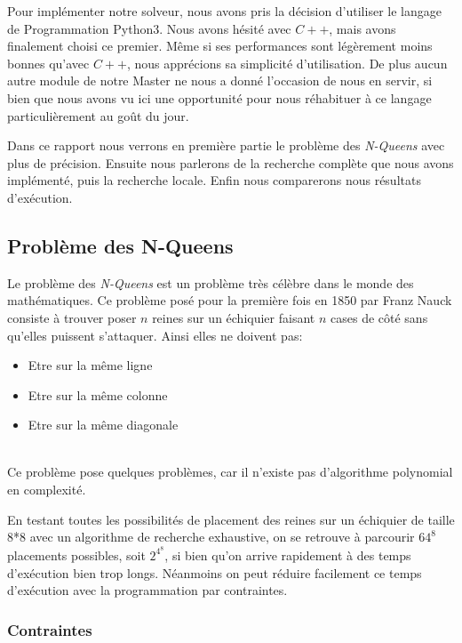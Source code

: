 \documentclass{article}
\begin{document}
Pour implémenter notre solveur, nous avons pris la décision d'utiliser le langage de Programmation Python3. Nous avons hésité avec $C++$, mais avons finalement choisi ce premier. Même si ses performances sont légèrement moins bonnes qu'avec $C++$, nous apprécions sa simplicité d’utilisation. De plus aucun autre module de notre Master ne nous a donné l’occasion de nous en servir, si bien que nous avons vu ici une opportunité pour nous réhabituer à ce langage particulièrement au goût du jour.

Dans ce rapport nous verrons en première partie le problème des \emph{N-Queens} avec plus de précision. Ensuite nous parlerons de la recherche complète que nous avons implémenté, puis la recherche locale. Enfin nous comparerons nous résultats d'exécution. 


\vspace{1cm}

\subsection{Problème des N-Queens}

Le problème des \emph{N-Queens} est un problème très célèbre dans le monde des mathématiques. Ce problème posé pour la première fois en 1850 par Franz Nauck consiste à trouver poser $n$ reines sur un échiquier faisant $n$ cases de côté sans qu'elles puissent s'attaquer. Ainsi elles ne doivent pas: 
\begin{itemize}
\item Etre sur la même ligne
\item Etre sur la même colonne
\item Etre sur la même diagonale
\end{itemize}

\\
Ce problème pose quelques problèmes, car il n'existe pas d'algorithme polynomial en complexité.


En testant toutes les possibilités de placement des reines sur un échiquier de taille 8*8 avec un algorithme de recherche exhaustive, on se retrouve à parcourir $64^8$ placements possibles, soit $2^4^8$, si bien qu'on arrive rapidement à des temps d'exécution bien trop longs. Néanmoins on peut réduire facilement ce temps d'exécution avec la programmation par contraintes. 
\newline

\subsubsection{Contraintes}
\end{document}
